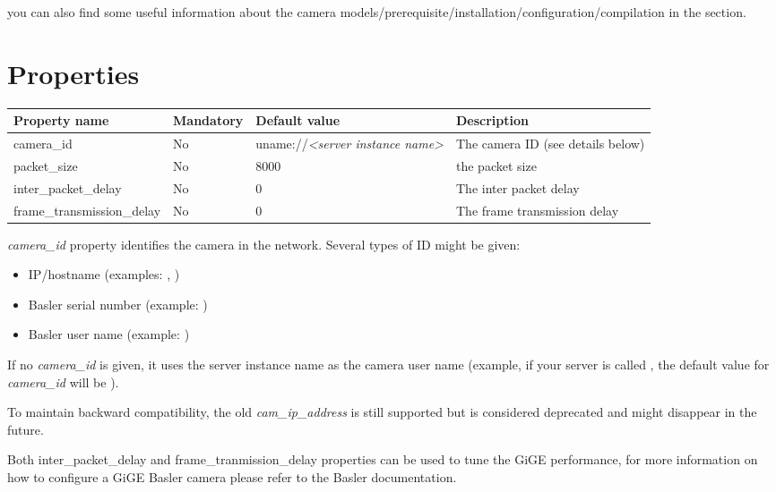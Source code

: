 \documentclass[letterpaper,10pt,english]{sphinxmanual}
\begin{document}
you can also find some useful information about the camera models/prerequisite/installation/configuration/compilation in the  section.


\section{Properties}
\label{BaslerCCD/baslerccd:properties}
\begin{tabulary}{\linewidth}{|L|L|L|L|}
\hline
\textsf{\relax 
Property name
} & \textsf{\relax 
Mandatory
} & \textsf{\relax 
Default value
} & \textsf{\relax 
Description
}\\
\hline
camera\_id
 & 
No
 & 
uname://\emph{\textless{}server instance name\textgreater{}}
 & 
The camera ID (see details below)
\\
\hline
packet\_size
 & 
No
 & 
8000
 & 
the packet size
\\
\hline
inter\_packet\_delay
 & 
No
 & 
0
 & 
The inter packet delay
\\
\hline
frame\_transmission\_delay
 & 
No
 & 
0
 & 
The frame transmission delay
\\
\hline\end{tabulary}


\emph{camera\_id} property identifies the camera in the network. Several types of ID might be given:
\begin{itemize}
\item {} 
IP/hostname (examples: , )

\item {} 
Basler serial number (example: )

\item {} 
Basler user name (example: )

\end{itemize}

If no \emph{camera\_id} is given, it uses the server instance name as the camera user name (example, if your server is
called , the default value for \emph{camera\_id} will be ).

To maintain backward compatibility, the old \emph{cam\_ip\_address} is still supported but is considered deprecated
and might disappear in the future.

Both inter\_packet\_delay and frame\_tranmission\_delay properties can be used to tune the GiGE performance, for
more information on how to configure a GiGE Basler camera please refer to the Basler documentation.
\end{document}
